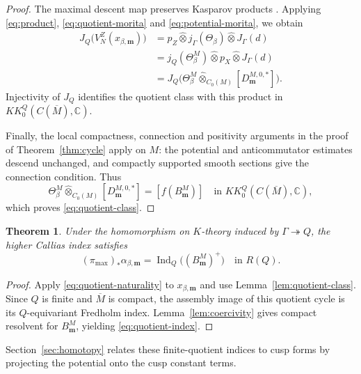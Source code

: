 \documentclass[11pt]{article}
\theoremstyle{definition}
\theoremstyle{plain}
\numberwithin{equation}{section}
\newtheorem{theorem}{Theorem}[section]
\newcommand{\Ind}{\operatorname{Ind}}
\begin{document}
\begin{proof}
The maximal descent map preserves Kasparov products
\cite[Theorem~20.6.2]{Blackadar}. Applying
\eqref{eq:product}, \eqref{eq:quotient-morita} and
\eqref{eq:potential-morita}, we obtain
\[
\begin{aligned}
 J_Q\bigl(V_N^Z(x_{\beta,\boldsymbol m})\bigr)
  &=p_Z\widehat\otimes j_\Gamma(\Theta_\beta)
              \widehat\otimes J_\Gamma(d)\\
  &=j_Q(\Theta_\beta^M)\widehat\otimes p_X
              \widehat\otimes J_\Gamma(d)\\
  &=J_Q\bigl(\Theta_\beta^M\widehat\otimes_{C_0(M)}
                    [D_{\boldsymbol m}^{M,0,*}]\bigr).
\end{aligned}
\]
Injectivity of $J_Q$ identifies the quotient class with this
product in $KK_0^Q(C(\overline M),\mathbb C)$.

Finally, the local compactness, connection and positivity arguments
in the proof of Theorem~\ref{thm:cycle} apply on $M$:
the potential and anticommutator estimates descend unchanged,
and compactly supported smooth sections give the connection
condition. Thus
\[
 \Theta_\beta^M\widehat\otimes_{C_0(M)}
        [D_{\boldsymbol m}^{M,0,*}]
      =[f(B_{\boldsymbol m}^M)]
      \quad\text{in }KK_0^Q(C(\overline M),\mathbb C),
\]
which proves \eqref{eq:quotient-class}.
\end{proof}

\begin{theorem}\label{thm:finite-quotient}
Under the homomorphism on $K$-theory induced by
$\Gamma\twoheadrightarrow Q$, the higher Callias index satisfies
\begin{equation}\label{eq:quotient-index}
 (\pi_{\max})_*\alpha_{\beta,\boldsymbol m}
       =\Ind_Q\bigl((B_{\boldsymbol m}^M)^+\bigr)
       \quad\text{in }R(Q).
\end{equation}
\end{theorem}

\begin{proof}
Apply \eqref{eq:quotient-naturality} to
$x_{\beta,\boldsymbol m}$ and use Lemma~\ref{lem:quotient-class}.
Since $Q$ is finite and $\overline M$ is compact, the assembly image
of this quotient cycle is its $Q$-equivariant Fredholm index.
Lemma~\ref{lem:coercivity} gives compact resolvent for
$B_{\boldsymbol m}^M$, yielding \eqref{eq:quotient-index}.
\end{proof}

Section~\ref{sec:homotopy} relates these finite-quotient indices
to cusp forms by projecting the potential onto the cusp
constant terms.
\end{document}
